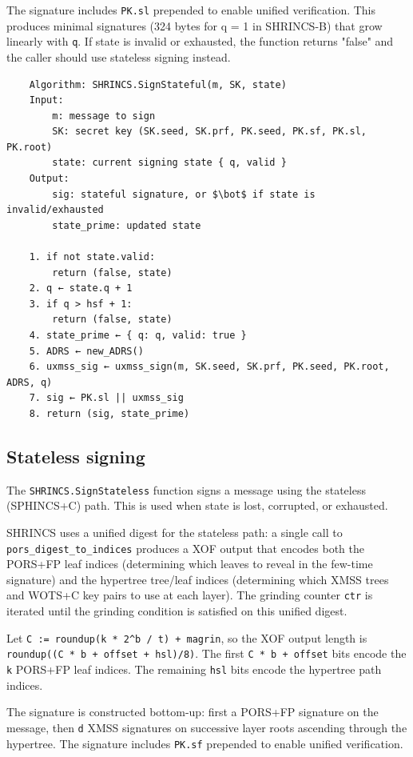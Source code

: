 The signature includes \texttt{PK.sl} prepended to enable unified verification. This produces minimal signatures (324 bytes for q = 1 in SHRINCS-B) that grow linearly with \texttt{q}. If state is invalid or exhausted, the function returns "false" and the caller should use stateless signing instead.
\begin{verbatim}
    Algorithm: SHRINCS.SignStateful(m, SK, state)
    Input:
        m: message to sign
        SK: secret key (SK.seed, SK.prf, PK.seed, PK.sf, PK.sl, PK.root)
        state: current signing state { q, valid }
    Output:
        sig: stateful signature, or $\bot$ if state is invalid/exhausted
        state_prime: updated state

    1. if not state.valid:
        return (false, state)
    2. q ← state.q + 1
    3. if q > hsf + 1:
        return (false, state)
    4. state_prime ← { q: q, valid: true }
    5. ADRS ← new_ADRS()
    6. uxmss_sig ← uxmss_sign(m, SK.seed, SK.prf, PK.seed, PK.root, ADRS, q)
    7. sig ← PK.sl || uxmss_sig
    8. return (sig, state_prime)
\end{verbatim}

\subsection{Stateless signing}
The \texttt{SHRINCS.SignStateless} function signs a message using the stateless (SPHINCS+C) path. This is used when state is lost, corrupted, or exhausted.

SHRINCS uses a unified digest for the stateless path: a single call to \texttt{pors\_digest\_to\_indices} produces a XOF output that encodes both the PORS+FP leaf indices (determining which leaves to reveal in the few-time signature) and the hypertree tree/leaf indices (determining which XMSS trees and WOTS+C key pairs to use at each layer). The grinding counter \texttt{ctr} is iterated until the grinding condition is satisfied on this unified digest.

Let \texttt{C := roundup(k * 2\string^b / t) + magrin}, so the XOF output length is \texttt{roundup((C * b + offset + hsl)/8)}. The first \texttt{C * b + offset} bits encode the \texttt{k} PORS+FP leaf indices. The remaining \texttt{hsl} bits encode the hypertree path indices.

The signature is constructed bottom-up: first a PORS+FP signature on the message, then \texttt{d} XMSS signatures on successive layer roots ascending through the hypertree. The signature includes \texttt{PK.sf} prepended to enable unified verification.

